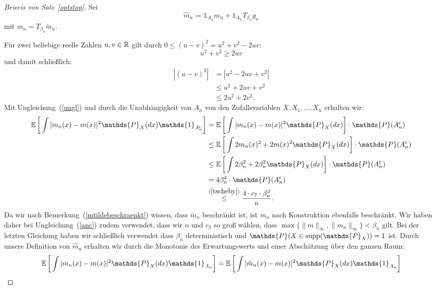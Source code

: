 \begin{proof}[Beweis von Satz~\ref{optstop}]
Sei $$\hat{m}_n \coloneqq \mathds{1}_{A_n}m_n + \mathds{1}_{A_n}T_{\beta_n}g_n$$
mit $m_n= T_{\beta_n}\tilde{m}_n$.

Für zwei beliebige reelle Zahlen $u, v \in \mathbb{R}$ gilt durch $0 \leq (u - v)^2 = u^2 + v^2 - 2uv$:
$$u^2 + v^2 \geq 2uv$$ und damit schließlich:
\begin{equation}
\label{ungl}
\begin{split}
|(u - v)^2| & = |u^2 - 2uv + v^2| \\
& \leq  u^2 + 2uv + v^2 \\
& \leq 2u^2 + 2v^2.
\end{split}
\end{equation}
Mit Ungleichung~(\ref{ungl}) und durch die Unabhängigkeit von $A_n$ von den Zufallsvariablen $X, X_1, \dots, X_n$ erhalten wir:
\begin{equation}
\label{anc}
\begin{split}
 \E \bigg[\int |m_n(x) - m(x)|^2 \mathds{P}_X(dx) \mathds{1}_{A_n^{\mathsf{c}}}\bigg] & =  \E \bigg[\int |m_n(x) - m(x)|^2 \mathds{P}_X(dx) \bigg] \cdot \mathds{P}(A_n^{\mathsf{c}}) \\
 & \leq \E \bigg[\int 2m_n(x)^2 + 2m(x)^2 \mathds{P}_X(dx)\bigg] \cdot \mathds{P}(A_n^{\mathsf{c}})\\
 & \leq \E \bigg[\int  2\beta_n^2 + 2\beta_n^2 \mathds{P}_X(dx)\bigg] \cdot \mathds{P}(A_n^{\mathsf{c}})\\
 & = 4\beta_n^2 \cdot \mathds{P}(A_n^{\mathsf{c}}) \\
 & \stackrel{(\ref{tscheby})}{\leq} \frac{4 \cdot c_7 \cdot \beta_n^2}{n}.
\end{split}
\end{equation}
Da wir nach Bemerkung~(\ref{mtildebeschraenkt}) wissen, dass $\tilde{m}_n$ beschränkt ist, ist $m_n$ nach Konstruktion ebenfalls beschränkt. Wir haben daher bei Ungleichung~(\ref{anc}) zudem verwendet, dass wir $n$ und $c_3$ so groß wählen, dass $\max\{\|m\|_{\infty}, \|m_n\|_{\infty}\} < \beta_n$ gilt. Bei der letzten Gleichung haben wir schließlich verwendet dass $\beta_n$ deterministisch und $\mathds{P}(X \in \supp(\mathds{P}_X)) = 1$ ist.
Durch unsere Definition von $\hat{m}_n$ erhalten wir durch die Monotonie des Erwartungswerts und einer Abschätzung über den ganzen Raum:
\begin{equation}
\label{an}
\begin{split}
\E \bigg[\int |m_n(x) - m(x)|^2 \mathds{P}_X(dx) \mathds{1}_{A_n}\bigg] & = \E \bigg[\int |\hat{m}_n(x) - m(x)|^2 \mathds{P}_X(dx) \mathds{1}_{A_n}\bigg] \\

\end{split}
\end{equation}
\end{proof}

